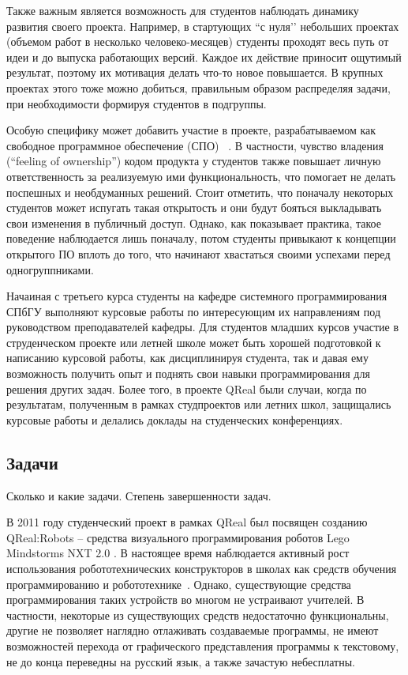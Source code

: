 \documentclass[a5paper]{article}
\begin{document}
Также важным является возможность для студентов наблюдать динамику развития своего проекта. Например, в стартующих ``с нуля’’ небольших проектах (объемом работ в несколько человеко-месяцев) студенты проходят весь путь от идеи и до выпуска работающих версий. Каждое их действие приносит ощутимый результат, поэтому их мотивация делать что-то новое повышается. В крупных проектах этого тоже можно добиться, правильным образом распределяя задачи, при необходимости формируя студентов в подгруппы. 

Особую специфику может добавить участие в проекте, разрабатываемом как свободное программное обеспечение (СПО) ~\cite{saratov}. В частности, чувство владения (``feeling of ownership'') кодом продукта у студентов также повышает личную ответственность за реализуемую ими функциональность, что помогает не делать поспешных и необдуманных решений. Стоит отметить, что поначалу некоторых студентов может испугать такая открытость и они будут бояться выкладывать свои изменения в публичный доступ. Однако, как показывает практика, такое поведение наблюдается лишь поначалу, потом студенты привыкают к концепции открытого ПО вплоть до того, что начинают хвастаться своими успехами перед одногруппниками.

Начаиная с третьего курса студенты на кафедре системного программирования СПбГУ выполняют курсовые работы по интересующим их направлениям под руководством преподавателей кафедры. Для студентов младших курсов участие в струденческом проекте или летней школе может быть хорошей подготовкой к написанию курсовой работы, как дисциплинируя студента, так и давая ему возможность получить опыт и поднять свои навыки программирования для решения других задач. Более того, в проекте QReal были случаи, когда по результатам, полученным в рамках студпроектов или летних школ, защищались курсовые работы и делались доклады на студенческих конференциях.
 
\subsection{Задачи}

Сколько и какие задачи. Степень завершенности задач.

В 2011 году студенческий проект в рамках QReal был посвящен созданию QReal:Robots -- средства визуального программирования роботов Lego Mindstorms NXT 2.0 . В настоящее время наблюдается активный рост использования робототехнических конструкторов в школах как средств обучения программированию и робототехнике~\cite{filippov}. Однако, существующие средства программирования таких устройств во многом не устраивают учителей. В частности, некоторые из существующих средств недостаточно функциональны, другие не позволяет наглядно отлаживать создаваемые программы, не имеют возможностей перехода от графического представления программы к текстовому, не до конца переведны на русский язык, а также зачастую небесплатны.
\end{document}
